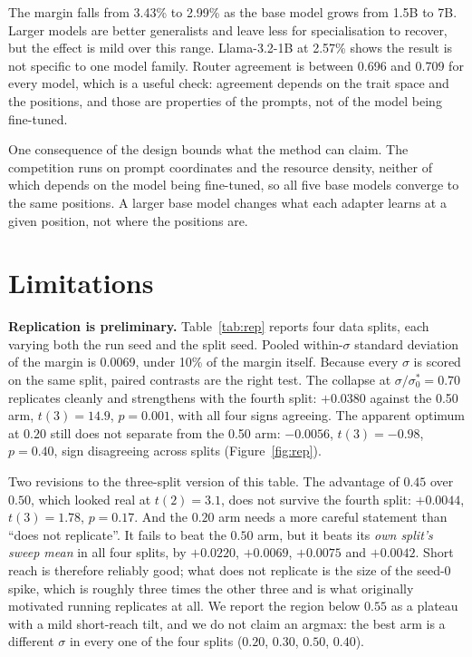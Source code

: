 \documentclass{article}
\begin{document}
The margin falls from 3.43\% to 2.99\% as the base model grows from 1.5B to 7B. Larger models are
better generalists and leave less for specialisation to recover, but the effect is mild over this
range. Llama-3.2-1B at 2.57\% shows the result is not specific to one model family. Router agreement
is between 0.696 and 0.709 for every model, which is a useful check: agreement depends on the trait
space and the positions, and those are properties of the prompts, not of the model being fine-tuned.

One consequence of the design bounds what the method can claim. The competition runs on prompt
coordinates and the resource density, neither of which depends on the model being fine-tuned, so all
five base models converge to the same positions. A larger base model changes what each adapter learns
at a given position, not where the positions are.

\section{Limitations}
\label{sec:limits}
\textbf{Replication is preliminary.} Table~\ref{tab:rep} reports four data splits, each varying both
the run seed and the split seed. Pooled within-$\sigma$ standard deviation of the margin is 0.0069,
under 10\% of the margin itself. Because every $\sigma$ is scored on the same split, paired contrasts
are the right test. The collapse at $\sigma/\sigma_0^*=0.70$ replicates cleanly and strengthens with
the fourth split: $+0.0380$ against the 0.50 arm, $t(3)=14.9$, $p=0.001$, with all four signs
agreeing. The apparent optimum at $0.20$ still does not separate from the 0.50 arm: $-0.0056$,
$t(3)=-0.98$, $p=0.40$, sign disagreeing across splits (Figure~\ref{fig:rep}).

Two revisions to the three-split version of this table. The advantage of $0.45$ over $0.50$, which
looked real at $t(2)=3.1$, does not survive the fourth split: $+0.0044$, $t(3)=1.78$, $p=0.17$. And
the $0.20$ arm needs a more careful statement than ``does not replicate''. It fails to beat the
$0.50$ arm, but it beats its \emph{own split's sweep mean} in all four splits, by $+0.0220$,
$+0.0069$, $+0.0075$ and $+0.0042$. Short reach is therefore reliably good; what does not replicate
is the size of the seed-0 spike, which is roughly three times the other three and is what originally
motivated running replicates at all. We report the region below $0.55$ as a plateau with a mild
short-reach tilt, and we do not claim an argmax: the best arm is a different $\sigma$ in every one of
the four splits ($0.20$, $0.30$, $0.50$, $0.40$).
\end{document}
